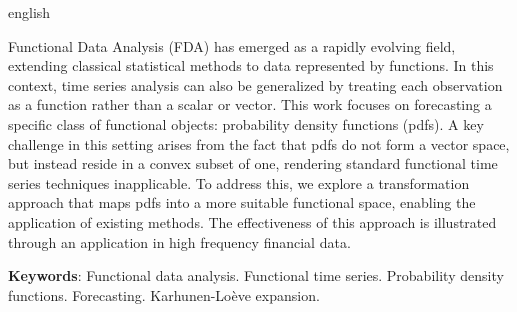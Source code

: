 \documentclass[
	12pt,				%
	oneside,			%
	a4paper,			%
	english,			%
	brazil				%
	]{abntex2ppgsi}
\begin{document}
% 
% 
\begin{resumo}[Abstract]
\begin{otherlanguage*}{english}

% 
%
%
%

Functional Data Analysis (FDA) has emerged as a rapidly evolving field, extending classical statistical methods to data represented by functions. In this context, time series analysis can also be generalized by treating each observation as a function rather than a scalar or vector. This work focuses on forecasting a specific class of functional objects: probability density functions (pdfs). A key challenge in this setting arises from the fact that pdfs do not form a vector space, but instead reside in a convex subset of one, rendering standard functional time series techniques inapplicable. To address this, we explore a transformation approach that maps pdfs into a more suitable functional space, enabling the application of existing methods. The effectiveness of this approach is illustrated through an application in high frequency financial data.

\textbf{Keywords}: Functional data analysis. Functional time series. Probability density functions. Forecasting. Karhunen-Loève expansion. 

\end{otherlanguage*}
\end{resumo}
\end{document}
